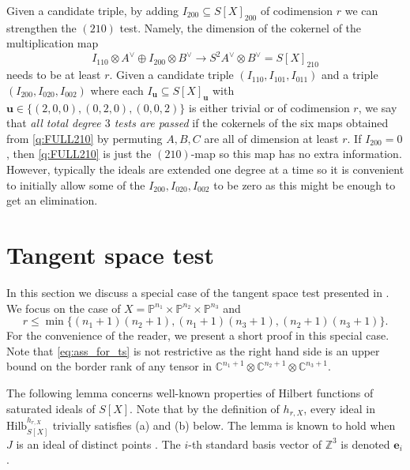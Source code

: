 \documentclass[12pt]{amsart}
\theoremstyle{definition}
\theoremstyle{remark}
\theoremstyle{definition}
\newcommand{\CC}{\mathbb{C}}
\newcommand{\Hilb}{\mathrm{Hilb}}
\begin{document}
Given a candidate triple, by adding $I_{200}\subseteq S[X]_{200}$ of codimension $r$ we can strengthen the $(210)$ test. Namely, the dimension of the cokernel of the multiplication map
\begin{equation}\label{q:FULL210}
I_{110}\otimes A^\vee \oplus I_{200}\otimes B^\vee \to S^2A^\vee \otimes B^\vee = S[X]_{210}
\end{equation}
needs to be at least $r$. Given a candidate triple $(I_{110}, I_{101}, I_{011})$ and a triple $(I_{200}, I_{020},I_{002})$  where each $I_{\mathbf{u}} \subseteq S[X]_\mathbf{u}$ with $\mathbf{u}\in \{(2,0,0), (0,2,0), (0,0,2)\}$ is either trivial or of codimension $r$, we say that \emph{all total degree $3$ tests are passed} if the cokernels of the six maps obtained from \eqref{q:FULL210} by permuting $A,B,C$ are all of dimension at least $r$. If $I_{200} = 0$, then \eqref{q:FULL210} is just the $(210)$-map so this map has no extra information. However, typically the ideals are extended one degree at a time so it is convenient to initially allow some of the $I_{200}, I_{020},I_{002}$ to be zero as this might be enough to get an elimination.


\section{Tangent space test}
In this section we discuss a special case of the tangent space test presented in \cite[Proposition~5.2]{Man23}. We focus on the case of $X=\mathbb{P}^{n_1}\times \mathbb{P}^{n_2}\times \mathbb{P}^{n_3}$ and 
\begin{equation}\label{eq:ass_for_ts}
r \leq \min \{(n_1+1)(n_2+1), (n_1+1)(n_3+1), (n_2+1)(n_3+1)\}.    
\end{equation}
For the convenience of the reader, we present a short proof in this special case. Note that \eqref{eq:ass_for_ts} is not restrictive as the right hand side is an upper bound on the border rank of any tensor in $\CC^{n_1+1}\otimes \CC^{n_2+1}\otimes \CC^{n_3+1}$.

The following lemma concerns well-known properties of Hilbert functions of saturated ideals of $S[X]$. Note that by the definition of $h_{r,X}$, every ideal in $\Hilb_{S[X]}^{h_{r,X}}$ trivially satisfies (a) and (b) below. The lemma is known to hold when $J$ is an ideal of distinct points \cite[Proposition~3.5]{Tuy02}. The $i$-th standard basis vector of $\mathbb{Z}^3$ is denoted $\mathbf{e}_i$. 
\end{document}
